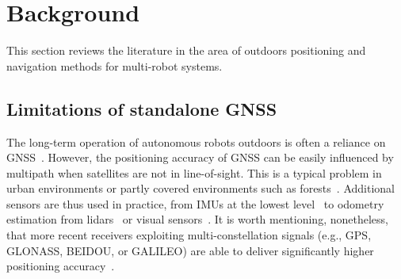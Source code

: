 

\section{Background} \label{sec:related_work}

This section reviews the literature in the area of outdoors positioning and navigation methods for multi-robot systems. 

\subsection{Limitations of standalone GNSS}

The long-term operation of autonomous robots outdoors is often a reliance on GNSS~\cite{qingqing2019multi}.  However, the positioning accuracy of GNSS can be easily influenced by multipath when satellites are not in line-of-sight. This is a typical problem in urban environments or partly covered environments such as forests~\cite{groves2012intelligent, li2020localization}. Additional sensors are thus used in practice, from IMUs at the lowest level~\cite{jiang2017board} to odometry estimation from lidars~\cite{chang2019gnss} or visual sensors~\cite{li2019tight}. It is worth mentioning, nonetheless, that more recent receivers exploiting multi-constellation signals (e.g., GPS, GLONASS, BEIDOU, or GALILEO) are able to deliver significantly higher positioning accuracy~\cite{li2019triple}.


